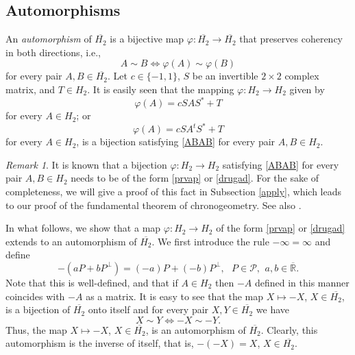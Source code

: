 \documentclass[10pt,a4paper]{amsart}
\providecommand{\index}[1]{}
\newcommand\oH{{\overline{H_2}}}
\newcommand\oR{{\overline{\mathbb{R}}}}
\theoremstyle{definition}
\theoremstyle{remark}
\newtheorem{remark}[theorem]{Remark}
\numberwithin{subsection}{section}
\numberwithin{equation}{section}
\begin{document}
\subsection{Automorphisms}\label{automorphism}
An \emph{automorphism} \index{automorphism} of $\oH$ is a bijective map $\varphi \colon \oH \to \oH$ that preserves coherency in both directions, i.e., 
\begin{equation}\label{ABAB}
A \sim B \iff \varphi (A) \sim \varphi (B)
\end{equation}
for every pair $A,B \in \oH$.
Let $c \in \{-1 , 1\}$, $S$ be an invertible $2 \times 2$ complex matrix, and $T \in H_2$. 
It is easily seen that the mapping $\varphi\colon H_2\to H_2$ given by 
\begin{equation}\label{prvap}
\varphi (A) = c SAS^\ast + T
\end{equation}
for every $A \in H_2$; or
\begin{equation}\label{drugad}
\varphi (A) = c SA^t S^\ast + T
\end{equation}
for every $A \in H_2$, is a bijection satisfying \eqref{ABAB} for every pair $A,B \in H_2$.


\begin{remark}\label{m4h2}
It is known that a bijection $\varphi\colon H_2\to H_2$ satisfying \eqref{ABAB} for every pair $A,B \in H_2$ needs to be of the form \eqref{prvap} or \eqref{drugad}. 
For the sake of completeness, we will give a proof of this fact in Subsection \ref{apply}, which leads to our proof of the fundamental theorem of chronogeometry.
See also \cite[Subsection 5.3]{Hua}.
\end{remark}

In what follows, we show that a map $\varphi\colon H_2\to H_2$ of the form \eqref{prvap} or \eqref{drugad} extends to an automorphism of $\oH$.
We first introduce the rule $-\infty = \infty$ and define
\[
-( a P + bP^{\perp}) =  (-a) P +(-b)P^{\perp}, \ \ \ P\in \mathcal{P}, \ \, a,b \in \oR.\index{$A$0@$-A$}
\]
Note that this is well-defined, and that if $A\in H_2$ then $-A$ defined in this manner coincides with $-A$ as a matrix.
It is easy to see that the map $X \mapsto -X$, $X  \in \oH$, is a bijection of $\oH$ onto itself and for every pair $X,Y \in \oH$ we have
\[
X \sim Y \iff - X \sim -Y.
\]
Thus, the map $X  \mapsto -X$, $X \in \oH$, is an automorphism of $\oH$. Clearly, this automorphism is the inverse of itself, that is, $-(-X) = X$, $X \in \oH$.
\end{document}
